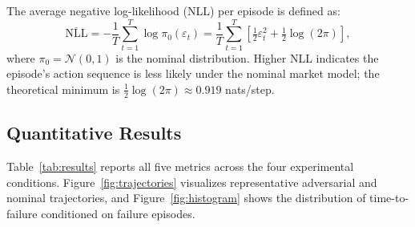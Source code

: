 \documentclass[conference]{IEEEtran}
\begin{document}
The average negative log-likelihood (NLL) per episode is defined as:
\begin{equation}
  \overline{\text{NLL}} = -\frac{1}{T}\sum_{t=1}^{T}
    \log \pi_0\!\left(\varepsilon_t\right)
  = \frac{1}{T}\sum_{t=1}^{T}
    \!\left[\tfrac{1}{2}\varepsilon_t^2 + \tfrac{1}{2}\log(2\pi)\right],
  \label{eq:nll}
\end{equation}
where $\pi_0 = \mathcal{N}(0,1)$ is the nominal distribution.
Higher NLL indicates the episode's action sequence is less likely under
the nominal market model; the theoretical minimum is $\tfrac{1}{2}\log(2\pi)
\approx 0.919$ nats/step.

\subsection{Quantitative Results}

Table~\ref{tab:results} reports all five metrics across the four experimental
conditions. Figure~\ref{fig:trajectories} visualizes representative
adversarial and nominal trajectories, and Figure~\ref{fig:histogram}
shows the distribution of time-to-failure conditioned on failure episodes.

\begin{table}[htbp]
\caption{Results: mean $\pm$ std over 5 trials $\times$ 500 episodes each}
\label{tab:results}
\centering
{}
\end{table}
\end{document}
